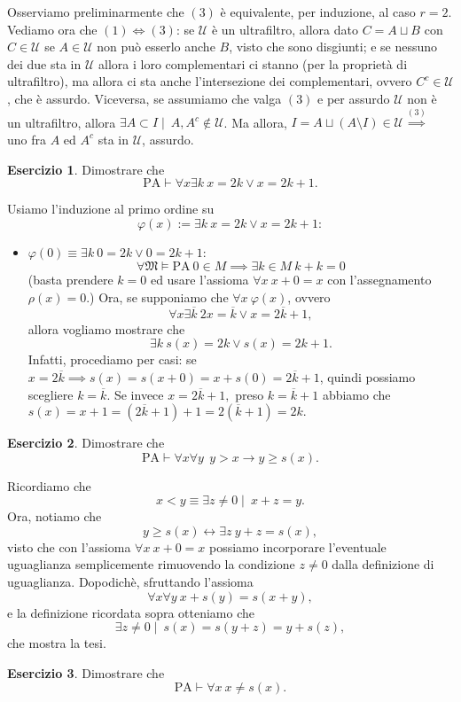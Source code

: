 \documentclass[a4paper]{article}
\newcommand{\limplies}{\rightarrow}
\newcommand{\liff}{\leftrightarrow}
\theoremstyle{definition}
\theoremstyle{definition}
\theoremstyle{remark}
\theoremstyle{definition}
\newtheorem*{exercise*}{Esercizio}
\begin{document}
\noindent
Osserviamo preliminarmente che $(3)$ è equivalente, per induzione, al caso $r=2$.
Vediamo ora che $(1)\iff(3)$: se $\mathcal{U}$ è un ultrafiltro, allora dato $C=A\sqcup B$ con $C\in\mathcal{U}$ se $A \in\mathcal{U}$ non può esserlo anche $B$, visto che sono
disgiunti; e se nessuno dei due sta in $\mathcal{U}$ allora i loro complementari ci stanno (per la proprietà di ultrafiltro), ma allora ci sta anche l'intersezione dei
complementari, ovvero $C^c\in\mathcal{U}$, che è assurdo. Viceversa, se assumiamo che valga $(3)$ e per assurdo $\mathcal{U}$ non è un ultrafiltro, allora $\exists A\subset
I\mid~A,A^c\not\in \mathcal{U}$. Ma allora, $I=A\sqcup(A\setminus I)\in\mathcal{U}\overset{(3)}{\implies}$ uno fra $A$ ed $A^c$ sta in $\mathcal{U}$, assurdo.
\begin{exercise*}
	Dimostrare che $$ \text{PA} \vdash \forall x \exists k~x=2k\lor x=2k+1.$$
\end{exercise*}
Usiamo l'induzione al primo ordine su $$\varphi(x):=\exists k~x=2k\lor x=2k+1:$$
\begin{itemize}
	\item $\varphi(0)\equiv \exists k~0=2k\lor 0=2k+1$: $$\forall\mathfrak{M}\models \text{PA}~0\in M\implies\exists k\in M~k+k=0$$ (basta prendere $k=0$ ed usare l'assioma $\forall x~
		x+0=x$ con l'assegnamento $\rho(x)=0$.)
		Ora, se supponiamo che $\forall x~\varphi(x)$, ovvero $$ \forall x\exists \overline{k}~ 2 x=\overline{k}\lor x=2 \overline{k}+1,$$ allora vogliamo mostrare che $$
		\exists k~s(x)=2k\lor s(x)=2k+1 .$$ Infatti, procediamo per casi: se $x=2 \overline{k}\implies s(x)=s(x+0)=x+s(0)=2 \overline{k}+1$, quindi possiamo scegliere
		$k=\overline{k}.$ Se invece $x=2 \overline{k}+1,$ preso $k=\overline{k}+1$ abbiamo che $s(x)=x+1=(2\overline{k}+1)+1=2(\overline{k}+1)=2k.$
\end{itemize}
\begin{exercise*}
	Dimostrare che $$ \text{PA} \vdash \forall x \forall y~~y>x\limplies y \geq s(x)  .$$
\end{exercise*}
Ricordiamo che $$x<y \equiv \exists z \neq 0\mid~ x+z=y.$$ Ora, notiamo che
$$ y\geq s(x) \liff \exists z~y+z=s(x) ,$$
visto che con l'assioma $\forall x~x+0=x$ possiamo incorporare l'eventuale uguaglianza semplicemente rimuovendo la condizione $z\neq 0$ dalla definizione di uguaglianza.
Dopodichè, sfruttando l'assioma $$\forall x \forall y~x+s(y)=s(x+y),$$ e la definizione ricordata sopra otteniamo che $$\exists z\neq 0\mid~ s(x)=s(y+z)=y+s(z),$$ che mostra la
tesi.
\begin{exercise*}
	Dimostrare che $$ \text{PA}\vdash \forall x~x\neq s(x) .$$
\end{exercise*}
\end{document}
